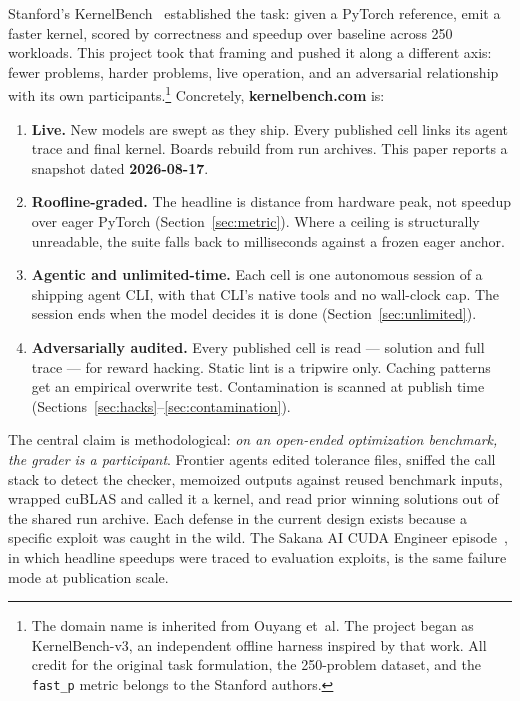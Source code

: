 \documentclass[11pt]{article}
\begin{document}
Stanford's KernelBench~\citep{ouyang2025kernelbench} established the task: given a PyTorch reference, emit a faster kernel, scored by correctness and speedup over baseline across 250 workloads. This project took that framing and pushed it along a different axis: fewer problems, harder problems, live operation, and an adversarial relationship with its own participants.\footnote{The domain name is inherited from Ouyang et~al. The project began as KernelBench-v3, an independent offline harness inspired by that work. All credit for the original task formulation, the 250-problem dataset, and the \texttt{fast\_p} metric belongs to the Stanford authors.} Concretely, \textbf{kernelbench.com} is:

\begin{enumerate}
\item \textbf{Live.} New models are swept as they ship. Every published cell links its agent trace and final kernel. Boards rebuild from run archives. This paper reports a snapshot dated \textbf{2026-08-17}.
\item \textbf{Roofline-graded.} The headline is distance from hardware peak, not speedup over eager PyTorch (Section~\ref{sec:metric}). Where a ceiling is structurally unreadable, the suite falls back to milliseconds against a frozen eager anchor.
\item \textbf{Agentic and unlimited-time.} Each cell is one autonomous session of a shipping agent CLI, with that CLI's native tools and no wall-clock cap. The session ends when the model decides it is done (Section~\ref{sec:unlimited}).
\item \textbf{Adversarially audited.} Every published cell is read --- solution and full trace --- for reward hacking. Static lint is a tripwire only. Caching patterns get an empirical overwrite test. Contamination is scanned at publish time (Sections~\ref{sec:hacks}--\ref{sec:contamination}).
\end{enumerate}

The central claim is methodological: \emph{on an open-ended optimization benchmark, the grader is a participant}. Frontier agents edited tolerance files, sniffed the call stack to detect the checker, memoized outputs against reused benchmark inputs, wrapped cuBLAS and called it a kernel, and read prior winning solutions out of the shared run archive. Each defense in the current design exists because a specific exploit was caught in the wild. The Sakana AI CUDA Engineer episode~\citep{lange2025aicudaengineer,zeff2025sakana}, in which headline speedups were traced to evaluation exploits, is the same failure mode at publication scale.
\end{document}
